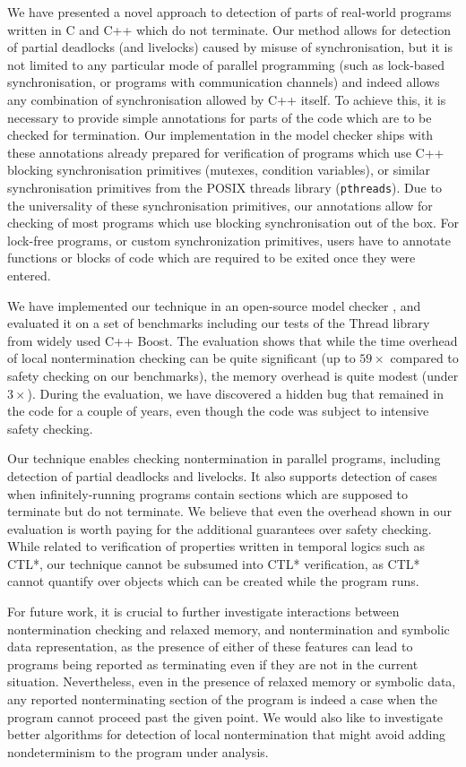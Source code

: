 We have presented a novel approach to detection of parts of real-world programs written in C and C++ which do not terminate.
Our method allows for detection of partial deadlocks (and livelocks) caused by misuse of synchronisation, but it is not limited to any particular mode of parallel programming (such as lock-based synchronisation, or programs with communication channels) and indeed allows any combination of synchronisation allowed by C++ itself.
To achieve this, it is necessary to provide simple annotations for parts of the code which are to be checked for termination.
Our implementation in the \divine model checker ships with these annotations already prepared for verification of programs which use C++ blocking synchronisation primitives (mutexes, condition variables), or similar synchronisation primitives from the POSIX threads library (\texttt{pthreads}).
Due to the universality of these synchronisation primitives, our annotations allow for checking of most programs which use blocking synchronisation out of the box.
For lock-free programs, or custom synchronization primitives, users have to annotate functions or blocks of code which are required to be exited once they were entered.

We have implemented our technique in an open-source model checker \divine, and evaluated it on a set of benchmarks including our tests of the Thread library from widely used C++ Boost.
The evaluation shows that while the time overhead of local nontermination checking can be quite significant (up to $59\times$ compared to safety checking on our benchmarks), the memory overhead is quite modest (under $3\times$).
During the evaluation, we have discovered a hidden bug that remained in the code for a couple of years, even though the code was subject to intensive safety checking.

Our technique enables checking nontermination in parallel programs, including
detection of partial deadlocks and livelocks.
It also supports detection of cases when infinitely-running programs contain
sections which are supposed to terminate but do not terminate.
We believe that even the overhead shown in our evaluation is worth paying for the
additional guarantees over safety checking.
While related to verification of properties written in temporal logics such as CTL*, our technique cannot be subsumed into CTL* verification, as CTL* cannot quantify over objects which can be created while the program runs.

For future work, it is crucial to further investigate interactions between nontermination checking and relaxed memory, and nontermination and symbolic data representation, as the presence of either of these features can lead to programs being reported as terminating even if they are not in the current situation.
Nevertheless, even in the presence of relaxed memory or symbolic data, any reported nonterminating section of the program is indeed a case when the program cannot proceed past the given point.
We would also like to investigate better algorithms for detection of local nontermination that might avoid adding nondeterminism to the program under analysis.

